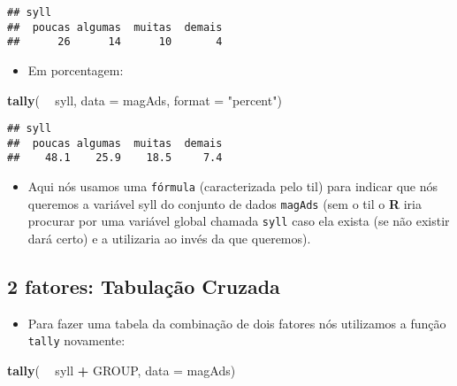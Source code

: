 \documentclass[]{article}
\newenvironment{Shaded}{\begin{snugshade}}{\end{snugshade}}
\newcommand{\KeywordTok}[1]{\textcolor[rgb]{0.13,0.29,0.53}{\textbf{#1}}}
\newcommand{\DataTypeTok}[1]{\textcolor[rgb]{0.13,0.29,0.53}{#1}}
\newcommand{\StringTok}[1]{\textcolor[rgb]{0.31,0.60,0.02}{#1}}
\newcommand{\OperatorTok}[1]{\textcolor[rgb]{0.81,0.36,0.00}{\textbf{#1}}}
\newcommand{\NormalTok}[1]{#1}
\providecommand{\tightlist}{%
  \setlength{\itemsep}{0pt}\setlength{\parskip}{0pt}}
\begin{document}
\begin{verbatim}
## syll
##  poucas algumas  muitas  demais 
##      26      14      10       4
\end{verbatim}

\begin{itemize}
\tightlist
\item
  Em porcentagem:
\end{itemize}

\begin{Shaded}
\begin{Highlighting}[]
\KeywordTok{tally}\NormalTok{( }\OperatorTok{~}\StringTok{ }\NormalTok{syll, }\DataTypeTok{data =}\NormalTok{ magAds, }\DataTypeTok{format =} \StringTok{"percent"}\NormalTok{)}
\end{Highlighting}
\end{Shaded}

\begin{verbatim}
## syll
##  poucas algumas  muitas  demais 
##    48.1    25.9    18.5     7.4
\end{verbatim}

\begin{itemize}
\tightlist
\item
  Aqui nós usamos uma \texttt{fórmula} (caracterizada pelo til) para
  indicar que nós queremos a variável syll do conjunto de dados
  \texttt{magAds} (sem o til o \textbf{R} iria procurar por uma variável
  global chamada \texttt{syll} caso ela exista (se não existir dará
  certo) e a utilizaria ao invés da que queremos).
\end{itemize}

\subsection{2 fatores: Tabulação
Cruzada}\label{fatores-tabulacao-cruzada}

\begin{itemize}
\tightlist
\item
  Para fazer uma tabela da combinação de dois fatores nós utilizamos a
  função \texttt{tally} novamente:
\end{itemize}

\begin{Shaded}
\begin{Highlighting}[]
\KeywordTok{tally}\NormalTok{( }\OperatorTok{~}\StringTok{ }\NormalTok{syll }\OperatorTok{+}\StringTok{ }\NormalTok{GROUP, }\DataTypeTok{data =}\NormalTok{ magAds)}
\end{Highlighting}
\end{Shaded}
\end{document}
